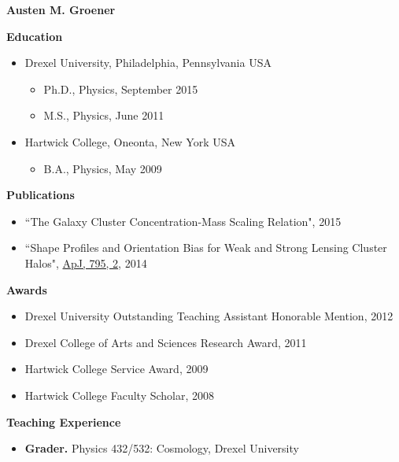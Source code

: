 \iffinal{}{\newpage}

\begin{vita}

{\Large\bf Austen M. Groener}

\singlespacing
{\large\bf Education}
\begin{itemize} \itemsep -2pt
\item Drexel University, Philadelphia, Pennsylvania USA
	\vspace{-2pt}
	\begin{itemize} \itemsep -2pt
		\item Ph.D., Physics, September 2015
		\item M.S., Physics, June 2011
	\end{itemize}
	\vspace{-2pt}
\item Hartwick College, Oneonta, New York USA
	\vspace{-2pt}
	\begin{itemize} \itemsep -2pt
		\item B.A., Physics, May 2009
	\end{itemize}
\end{itemize}

{\large\bf Publications}
\begin{itemize} \itemsep -2pt
	\item ``The Galaxy Cluster Concentration-Mass Scaling Relation", 2015
	\item ``Shape Profiles and Orientation Bias for Weak and Strong Lensing Cluster Halos", \href{http://dx.doi.org/10.1088/0004-637X/795/2/153}{ApJ, 795, 2}, 2014
\end{itemize}

{\large\bf Awards}
\begin{itemize} \itemsep -2pt
\item Drexel University Outstanding Teaching Assistant Honorable Mention, 2012
\item Drexel College of Arts and Sciences Research Award, 2011
\item Hartwick College Service Award, 2009
\item Hartwick College Faculty Scholar, 2008
\end{itemize}


{\large\bf Teaching Experience}

\begin{itemize} \itemsep -2pt

\item {\bf Grader.} Physics 432/532: Cosmology, Drexel University


\end{itemize}
\end{vita}
